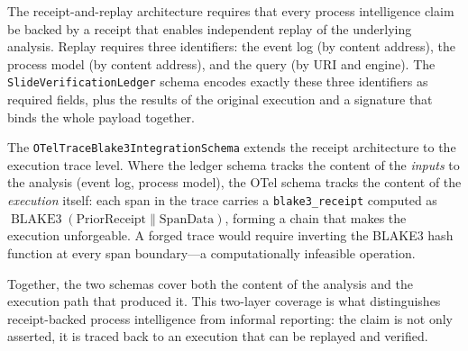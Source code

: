 The receipt-and-replay architecture requires that every process intelligence claim be backed by a
receipt that enables independent replay of the underlying analysis. Replay requires three
identifiers: the event log (by content address), the process model (by content address), and the
query (by URI and engine). The \texttt{SlideVerificationLedger} schema encodes exactly these three
identifiers as required fields, plus the results of the original execution and a signature that
binds the whole payload together.

The \texttt{OTelTraceBlake3IntegrationSchema} extends the receipt architecture to the execution
trace level. Where the ledger schema tracks the content of the \emph{inputs} to the analysis
(event log, process model), the OTel schema tracks the content of the \emph{execution} itself:
each span in the trace carries a \texttt{blake3\_receipt} computed as
$\operatorname{BLAKE3}(\text{PriorReceipt} \| \text{SpanData})$, forming a chain that makes the
execution unforgeable. A forged trace would require inverting the BLAKE3 hash function at every
span boundary---a computationally infeasible operation.

Together, the two schemas cover both the content of the analysis and the execution path that
produced it. This two-layer coverage is what distinguishes receipt-backed process intelligence
from informal reporting: the claim is not only asserted, it is traced back to an execution that
can be replayed and verified.
